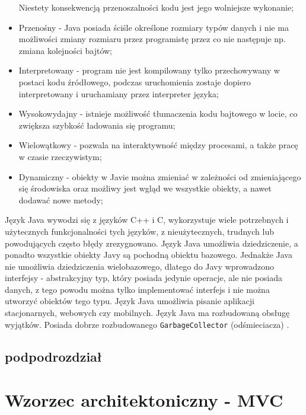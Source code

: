 \documentclass[eng,printmode,oneside]{mgr}
\begin{document}
\begin{itemize}
  Niestety konsekwencją przenoszalności kodu jest jego wolniejsze wykonanie;
  \item Przenośny - Java posiada ściśle określone rozmiary typów danych i nie ma
  możliwości zmiany rozmiaru przez programistę przez co nie następuje np. zmiana
  kolejności bajtów;
  \item Interpretowany - program nie jest kompilowany tylko przechowywany w
  postaci kodu źródłowego, podczas uruchomienia zostaje dopiero interpretowany i
  uruchamiany przez interpreter języka;
  \item Wysokowydajny - istnieje możliwość tłumaczenia kodu bajtowego w locie,
  co zwiększa szybkość ładowania się programu;
  \item Wielowątkowy - pozwala na interaktywność między procesami, a także pracę
  w czasie rzeczywistym;
  \item Dynamiczny - obiekty w Javie można zmieniać w zależności od
  zmieniającego się środowiska oraz możliwy jest wgląd we wszystkie obiekty, a
  nawet dodawać nowe metody;
\end{itemize}

Język Java wywodzi się z języków C++ i C, wykorzystuje wiele potrzebnych i
użytecznych funkcjonalności tych języków, z nieużytecznych, trudnych lub
powodujących często błędy zrezygnowano. Język Java umożliwia dziedziczenie, a
ponadto wszystkie obiekty Javy są pochodną obiektu bazowego. Jednakże Java nie
umożliwia dziedziczenia wielobazowego, dlatego do Javy wprowadzono interfejsy -
abstrakcyjny typ, który posiada jedynie operacje, ale nie posiada danych, z tego
powodu można tylko implementować interfejs i nie można utworzyć obiektów tego
typu. Język Java umożliwia pisanie aplikacji stacjonarnych, webowych czy
mobilnych. Język Java ma rozbudowaną obsługę wyjątków. Posiada dobrze
rozbudowanego \texttt{GarbageCollector} (odśmieciacza) \cite{java.doc}.
\subsection{podpodrozdział}

\section{Wzorzec architektoniczny - MVC}
\end{document}

